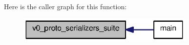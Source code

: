 Here is the caller graph for this function:\nopagebreak
\begin{figure}[H]
\begin{center}
\leavevmode
\includegraphics[width=248pt]{v0__protocol__serializers_8c_ac00bbc6bc38d8eee4bacafb3d3a0d18c_icgraph}
\end{center}
\end{figure}


